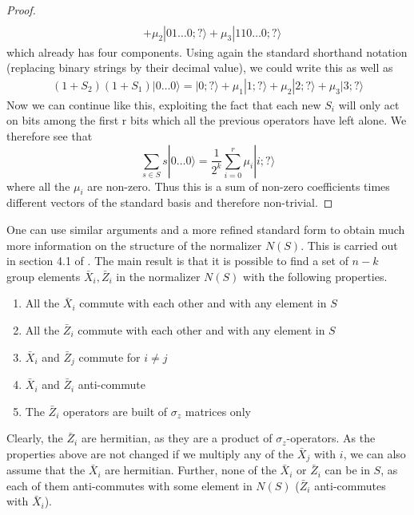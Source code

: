\documentclass[a4paper, draft]{article}
\theoremstyle{own}
\theoremstyle{remark}
\begin{document}
\begin{proof}
\begin{align*}
\\
&+ \mu_2 |0 1 \dots 0; ? \rangle + \mu_3 |1 1 0 \dots 0 ; ? \rangle
\end{align*}
which already has four components. Using again the standard shorthand notation (replacing binary strings by their decimal value), we could write this as well as
\begin{align*}
(1 + S_2)(1 + S_1) | 0 \dots 0 \rangle 
=
 |0 ; ? \rangle + \mu_1 |1 ; ? \rangle 
+ \mu_2 |2 ; ? \rangle + \mu_3 |3  ; ? \rangle
\end{align*}
Now we can continue like this, exploiting the fact that each new $S_i$ will only act on bits among the first r bits which all the previous operators have left alone. We therefore see that
$$
\sum_{s \in S} s |0 \dots 0 \rangle = \frac{1}{2^k} \sum_{i=0}^r \mu_i |i ; ? \rangle
$$
where all the $\mu_i$ are non-zero. Thus this is a sum of non-zero coefficients times different vectors of the standard basis and therefore non-trivial.
\end{proof}

One can use similar arguments and a more refined standard form to obtain much more information on the structure of the normalizer $N(S)$. This is carried out in section 4.1 of \cite{GThesis}. The main result is that it is possible to find a set of $n - k$ group elements $\bar{X}_i, \bar{Z}_i$ in the normalizer $N(S)$ with the following properties.

\begin{enumerate}
	\item All the $\bar{X}_i$ commute with each other and with any element in $S$
	\item All the $\bar{Z}_i$ commute with each other and with any element in $S$
	\item $\bar{X}_i$ and $\bar{Z}_j$ commute for $i \neq j$
	\item $\bar{X}_i$ and $\bar{Z}_i$ anti-commute
	\item The $\bar{Z}_i$ operators are built of $\sigma_z$ matrices only
\end{enumerate}

Clearly, the $\bar{Z}_i$ are hermitian, as they are a product of $\sigma_z$-operators. As the properties above are not changed if we multiply any of the $\bar{X}_j$ with $i$, we can also assume that the $\bar{X}_i$ are hermitian. Further, none of the $\bar{X}_i$ or $\bar{Z}_i$ can be in $S$, as each of them anti-commutes with some element in $N(S)$ ($\bar{Z}_i$ anti-commutes with $\bar{X}_i$).
\end{document}
